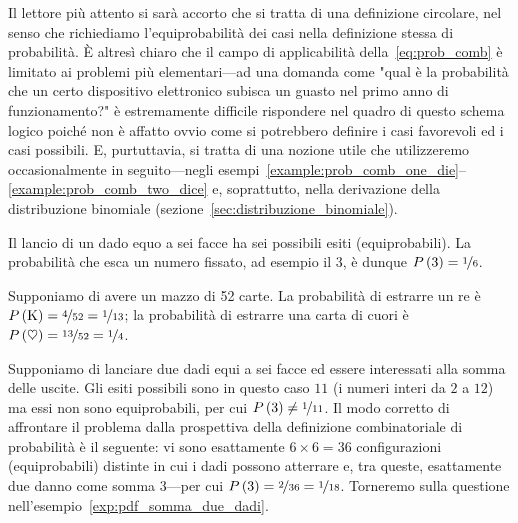 Il lettore più attento si sarà accorto che si tratta di una definizione
circolare, nel senso che richiediamo l'equiprobabilità dei casi nella
definizione stessa di probabilità. \`E altresì chiaro che il campo
di applicabilità della~\eqref{eq:prob_comb} è limitato ai problemi più
elementari---ad una domanda come "qual è la probabilità che un certo
dispositivo elettronico subisca un guasto nel primo anno di funzionamento?"
è estremamente difficile rispondere nel quadro di questo schema logico
poiché non è affatto ovvio come si potrebbero definire i casi favorevoli
ed i casi possibili. E, purtuttavia, si tratta di una nozione utile che
utilizzeremo occasionalmente in seguito---negli
esempi~\ref{example:prob_comb_one_die}--\ref{example:prob_comb_two_dice} e,
soprattutto, nella derivazione della distribuzione binomiale
(sezione~\ref{sec:distribuzione_binomiale}).

\begin{examplebox}
  \begin{example}\label{example:prob_comb_one_die}
    Il lancio di un dado equo a sei facce ha sei possibili esiti
    (equiprobabili). La probabilità che esca un numero fissato, ad esempio
    il $3$, è dunque $\displaystyle P\left(3\right) = \nicefrac{1}{6}$.
  \end{example}

  \begin{example}
    Supponiamo di avere un mazzo di 52 carte. La probabilità di estrarre
    un re è $\displaystyle P\left(\text{K}\right) = \nicefrac{4}{52} = \nicefrac{1}{13}$;
    la probabilità di estrarre una carta di cuori è
    $\displaystyle P\left(\heartsuit\right) = \nicefrac{13}{52} = \nicefrac{1}{4}$.
  \end{example}

  \begin{example}\label{example:prob_comb_two_dice}
    Supponiamo di lanciare due dadi equi a sei facce ed essere interessati alla
    somma delle uscite. Gli esiti possibili sono in questo caso $11$ (i numeri
    interi da $2$ a $12$) ma essi non sono equiprobabili, per cui
    $\displaystyle P\left(3\right) \neq \nicefrac{1}{11}$.
    Il modo corretto di affrontare il problema dalla prospettiva della
    definizione combinatoriale di probabilità è il seguente: vi sono
    esattamente $6 \times 6 = 36$ configurazioni (equiprobabili) distinte in
    cui i dadi possono atterrare e, tra queste, esattamente due danno come
    somma $3$---per cui $\displaystyle P\left(3\right) = \nicefrac{2}{36} = \nicefrac{1}{18}$.
    Torneremo sulla questione nell'esempio~\ref{exp:pdf_somma_due_dadi}.
  \end{example}
\end{examplebox}


